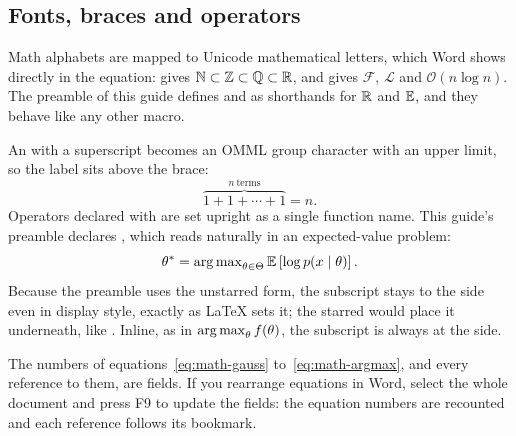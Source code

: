 \subsection{Fonts, braces and operators}

Math alphabets are mapped to Unicode mathematical letters, which Word shows directly in the
equation:
 gives $\mathbb{N} \subset \mathbb{Z} \subset \mathbb{Q} \subset \mathbb{R}$, and
 gives $\mathcal{F}$, $\mathcal{L}$ and $\mathcal{O}(n \log n)$. The preamble of
this guide defines  and  as shorthands for $\mathbb{R}$ and $\mathbb{E}$, and they behave like
any other macro.

An  with a superscript becomes an OMML group character with an upper limit, so
the label sits above the brace:
\begin{equation}\label{eq:math-brace}
  \overbrace{1 + 1 + \cdots + 1}^{n\ \text{terms}} = n.
\end{equation}
Operators declared with  are set upright as a single function name.
This guide's preamble declares , which reads naturally in an expected-value
problem:
\begin{equation}\label{eq:math-argmax}
  \theta^{\ast} = \operatorname{arg\,max}_{\theta \in \Theta} \mathbb{E}\left[ \log p(x \mid \theta) \right].
\end{equation}
Because the preamble uses the unstarred form, the subscript stays to the side even in display
style, exactly as \LaTeX{} sets it; the starred  would place it
underneath, like . Inline, as in $\operatorname{arg\,max}_{\theta} f(\theta)$, the subscript is
always at the side.

\begin{tip}
The numbers of equations~\eqref{eq:math-gauss} to~\eqref{eq:math-argmax}, and every reference
to them, are fields. If you rearrange equations in Word, select the whole document and press F9
to update the fields: the equation numbers are recounted and each reference follows its
bookmark.
\end{tip}
